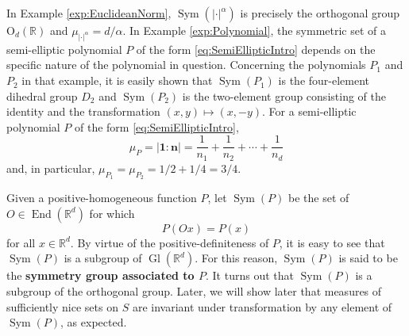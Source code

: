 \documentclass[11pt, letter]{book}
\newenvironment{example}
  {\pushQED{\qed}\renewcommand{\qedsymbol}{$\triangle$}\examplex}
  {\popQED\endexamplex}
\newcommand\End{\operatorname{End}} %
\newcommand\Gl{\operatorname{Gl}} %
\newcommand\OdR{\mbox{O}_d(\mathbb{R})} %
\newcommand\Sym{\operatorname{Sym}}
\begin{document}
\begin{example}\normalfont
In Example \ref{exp:EuclideanNorm}, $\Sym(|\cdot|^\alpha)$ is precisely the orthogonal group $\OdR$ and $\mu_{|\cdot|^\alpha}=d/\alpha$. In Example \ref{exp:Polynomial}, the symmetric set of a semi-elliptic polynomial $P$ of the form \eqref{eq:SemiEllipticIntro} depends on the specific nature of the polynomial in question. Concerning the polynomials $P_1$ and $P_2$ in that example, it is easily shown that $\Sym(P_1)$ is the four-element dihedral group $D_2$ and $\Sym(P_2)$ is the two-element group consisting of the identity and the transformation $(x,y)\mapsto (x,-y)$. For a semi-elliptic polynomial $P$ of the form \eqref{eq:SemiEllipticIntro}, 
\begin{equation*}
    \mu_P=|\mathbf{1}:\mathbf{n}|=\frac{1}{n_1}+\frac{1}{n_2}+\cdots+\frac{1}{n_d}
\end{equation*}
and, in particular, $\mu_{P_1}=\mu_{P_2}=1/2+1/4=3/4.$
\end{example}

\noindent Given a positive-homogeneous function $P$, let $\Sym(P)$ be the set of $O\in\End(\mathbb{R}^d)$ for which
\begin{equation*}
P(Ox)=P(x)
\end{equation*}
for all $x\in\mathbb{R}^d$. By virtue of the positive-definiteness of $P$, it is easy to see that $\Sym(P)$ is a subgroup of $\Gl(\mathbb{R}^d)$. For this reason, $\Sym(P)$ is said to be the \textbf{symmetry group associated to $P$}. It turns out that $\Sym{(P)}$ is a subgroup of the orthogonal group. Later, we will show later that measures of sufficiently nice sets on $S$ are invariant under transformation by any element of $\Sym(P)$, as expected.  
\end{document}
